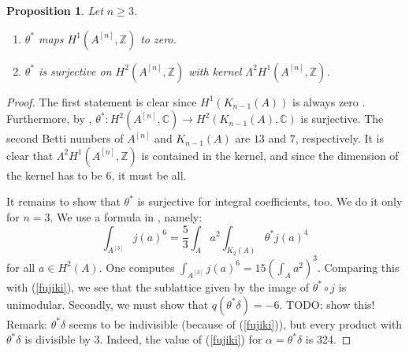 \documentclass{amsart}
\newcommand{\hilb}[1]{^{[#1]}}
\newcommand{\kum}[2]{K_{ #2 }( #1 )}
\newcommand{\C}{\mathbb{C}}
\newcommand{\Z}{\mathbb{Z}}
\theoremstyle{plain}
\newtheorem{proposition}[theorem]{Proposition}
\theoremstyle{definition}
\theoremstyle{remark}
\begin{document}
\begin{proposition}Let $n\geq 3$.
\begin{enumerate} 
 \item $\theta^*$ maps $H^1(A\hilb{n},\Z)$ to zero.
 \item $\theta^*$ is surjective on $H^2(A\hilb{n},\Z)$ with kernel $\Lambda^2H^1(A\hilb{n},\Z)$.
\end{enumerate}
\end{proposition}
\begin{proof}
The first statement is clear since $H^1(\kum{A}{n-1})$ is always zero \cite[Thm.~3]{Beauville}. Furthermore, by \cite[Sect.~7]{Beauville}, $\theta^{\ast} : H^2(A\hilb{n},\C) \rightarrow H^2(\kum{A}{n-1},\C)$ is surjective. The second Betti numbers of $A\hilb{n}$ and $\kum{A}{n-1}$ are $13$ and $7$, respectively. It is clear that $\Lambda^2H^1(A\hilb{n},\Z)$ is contained in the kernel, and since the dimension of the kernel has to be $6$, it must be all.

It remains to show that $\theta^*$  is surjective for integral coefficients, too. We do it only for $n=3$. We use a formula in \cite[p. 8]{Britze}, namely:
\begin{equation} \int_{A\hilb{3}}j(a)^6 = \frac{5}{3} \int_A a^2 \int_{\kum{A}{2}} \theta^* j(a)^4
\end{equation}
for all $a\in H^2(A)$. One computes $\int_{A\hilb{3}}j(a)^6 = 15 \left(\int_A a^2\right)^3$. Comparing this with (\ref{fujiki}), we see that the sublattice given by the image of $\theta^*\circ j$ is unimodular. Secondly, we must show that $q(\theta^*\delta) = -6$. TODO: show this! 
Remark: $\theta^*\delta$ seems to be indivisible (because of (\ref{fujiki})), but every product with $\theta^*\delta$ is divisible by 3. Indeed, the value of (\ref{fujiki}) for $\alpha=\theta^*\delta$ is 324.
\end{proof}
\end{document}
